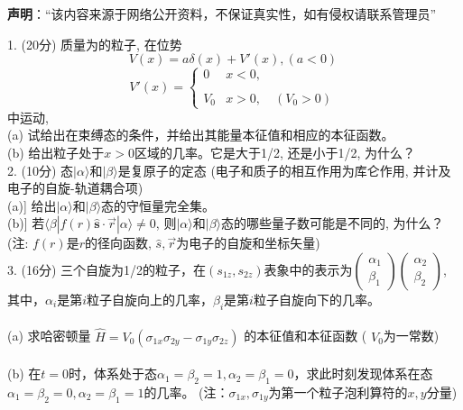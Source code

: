 
\textbf{声明}：“该内容来源于网络公开资料，不保证真实性，如有侵权请联系管理员”

1. (20分) 质量为的粒子, 在位势
$$V(x) = a \delta (x) + V'(x), (a < 0)~$$
$$V'(x) = \begin{cases} 0 & x < 0, \\\\ V_0 & x > 0,\quad (V_0 > 0)\end{cases}~$$
中运动,\\
(a) 试给出在束缚态的条件，并给出其能量本征值和相应的本征函数。\\
(b) 给出粒子处于$ x > 0 $区域的几率。它是大于1/2, 还是小于1/2, 为什么？\\

2. (10分) 态$|\alpha\rangle$和$|\beta\rangle$是复原子的定态 (电子和质子的相互作用为库仑作用, 并计及电子的自旋-轨道耦合项)\\
(a)] 给出$|\alpha\rangle$和$|\beta\rangle$态的守恒量完全集。\\
(b)] 若$\langle \beta | f({r}) \hat{\mathbf{s}} \cdot \vec{r} | \alpha \rangle \neq 0$, 则$|\alpha\rangle$和$|\beta\rangle$态的哪些量子数可能是不同的, 为什么？\\
(注: $f({r})$是$r$的径向函数, $\hat{s},\vec{r}$为电子的自旋和坐标矢量)\\

3. (16分) 三个自旋为1/2的粒子，在$(s_{1z}, s_{2z})$表象中的表示为$\begin{pmatrix} \alpha_1 \\ \beta_1 \end{pmatrix} \begin{pmatrix} \alpha_2 \\ \beta_2 \end{pmatrix}$, 其中，$\alpha_i$是第$i$粒子自旋向上的几率，$\beta_i$是第$i$粒子自旋向下的几率。\\\\
(a) 求哈密顿量 
$\hat{H} = V_0 (\sigma_{1x} \sigma_{2y} - \sigma_{1y} \sigma_{2z})$
    的本征值和本征函数 ( $V_0$为一常数)\\\\
(b) 在$t=0$时，体系处于态$\alpha_1 = \beta_2 = 1, \alpha_2 = \beta_1 = 0$，求此时刻发现体系在态$\alpha_1 = \beta_2 = 0, \alpha_2 = \beta_1 = 1$的几率。
    (注：$\sigma_{1x}, \sigma_{1y}$为第一个粒子泡利算符的$x,y$分量)